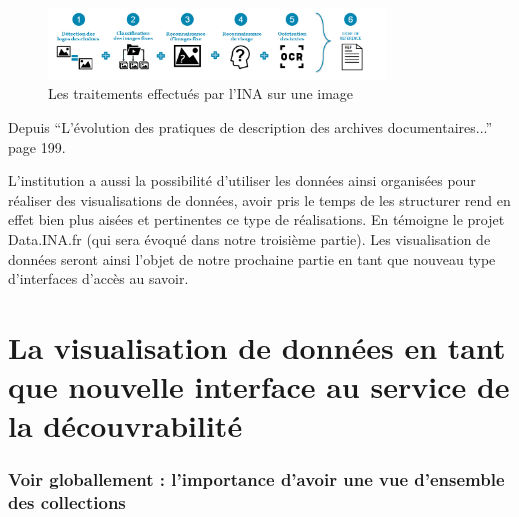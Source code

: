 \begin{figure}[h!]
	\centering
	\includegraphics[width=0.8\textwidth]{images/image11.png}
	\caption{Les traitements effectués par l'INA sur une image}
	\label{fig:image11}
\end{figure}


\begin{center}
	Depuis \enquote{L'évolution des pratiques de description des archives documentaires...} page 199. 
\end{center}

L’institution a aussi la possibilité d'utiliser les données ainsi organisées pour réaliser des visualisations de données, avoir pris le temps de les structurer rend en effet bien plus aisées et pertinentes ce type de réalisations. En témoigne le projet Data.INA.fr (qui sera évoqué dans notre troisième partie). Les visualisation de données seront ainsi l’objet de notre prochaine partie en tant que nouveau type d'interfaces d'accès au savoir.

\chapter{La visualisation de données en tant que nouvelle interface au service de la découvrabilité}

\subsection{Voir globallement : l'importance d'avoir une vue d'ensemble des collections}


